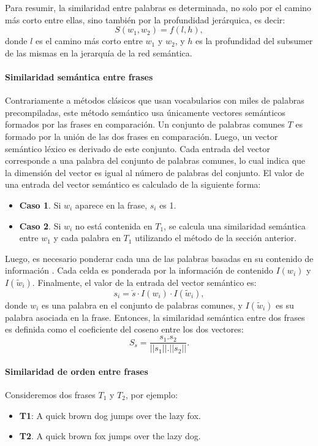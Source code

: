 \bigskip Para resumir, la similaridad entre palabras es determinada, no solo por el camino más corto entre ellas, sino también por la profundidad jerárquica, es decir:
\[S(w_1,w_2)=f(l,h),\]
donde \(l\) es el camino más corto entre \(w_1\) y \(w_2\), y \(h\) es la profundidad del subsumer de las mismas en la jerarquía de la red semántica.

\paragraph{Similaridad semántica entre frases}
Contrariamente a métodos clásicos que usan vocabularios con miles de palabras precompiladas, este método semántico usa únicamente vectores semánticos formados por las frases en comparación. Un conjunto de palabras comunes \(T\) es formado por la unión de las dos frases en comparación. Luego, un vector semántico léxico es derivado de este conjunto. Cada entrada del vector corresponde a una palabra del conjunto de palabras comunes, lo cual indica que la dimensión del vector es igual al número de palabras del conjunto. El valor de una entrada del vector semántico es calculado de la siguiente forma:
\begin{itemize}
	\item \textbf{Caso 1}. Si \(w_i\) aparece en la frase, \(s_i\) es 1.
	\item \textbf{Caso 2}. Si \(w_i\) no está contenida en \(T_1\), se calcula una similaridad semántica entre \(w_1\) y cada palabra en \(T_1\) utilizando el método de la sección anterior.
\end{itemize}

Luego, es necesario ponderar cada una de las palabras basadas en su contenido de información \citep{ribadas2005semantic}. Cada celda es ponderada por la información de contenido \(I(w_i)\) y \(I(\widetilde{w}_i)\). Finalmente, el valor de la entrada del vector semántico es:
\[s_i = \check{s} \cdot I(w_i) \cdot I(\widetilde{w}_i),\]
donde \(w_i\) es una palabra en el conjunto de palabras comunes, y \(I(\widetilde{w}_i)\) es su palabra asociada en la frase. Entonces, la similaridad semántica entre dos frases es definida como el coeficiente del coseno entre los dos vectores:
\[S_s = \frac{s_1. s_2}{||s_1||.||s_2||}.\]

\paragraph{Similaridad de orden entre frases}
Consideremos dos frases \(T_1\) y \(T_2\), por ejemplo:
\begin{itemize}
	\item \textbf{T1}: A quick brown dog jumps over the lazy fox.
	\item \textbf{T2}. A quick brown fox jumps over the lazy dog.
\end{itemize}

